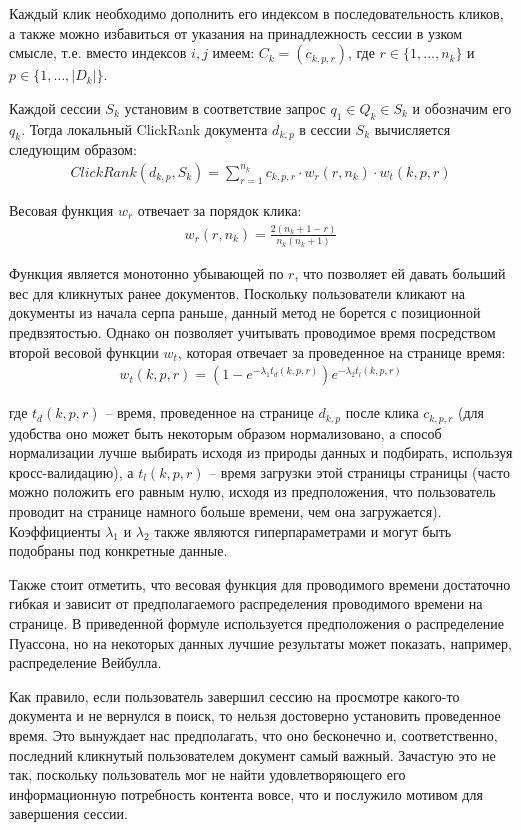\documentclass[diploma]{nanolab2015}
\begin{document}
Каждый клик необходимо дополнить его индексом в последовательность кликов, а также можно избавиться от указания на принадлежность сессии в узком смысле, т.е. вместо индексов $i,j$ имеем: $C_k = (c_{k,p,r})$, где $r \in \{1, \dots, n_k\}$ и $p \in \{1, \dots, |D_k|\}$.

Каждой сессии $S_k$ установим в соответствие запрос $q_1 \in Q_k \in S_k$ и обозначим его $q_k$. Тогда локальный ClickRank \cite{clickrank} документа $d_{k,p}$ в сессии $S_k$ вычисляется следующим образом:
\begin{align}
    ClickRank(d_{k,p}, S_k) = \sum_{r=1}^{n_k} c_{k, p, r} \cdot w_r(r, n_k) \cdot w_t(k,p,r)
\end{align}

Весовая функция $w_r$ отвечает за порядок клика:
\begin{align}
    w_r(r, n_k) = \frac{2(n_k + 1 - r)}{n_k(n_k + 1)}
\end{align}

Функция является монотонно убывающей по $r$, что позволяет ей давать больший вес для кликнутых ранее документов. Поскольку пользователи кликают на документы из начала серпа раньше, данный метод не борется с позиционной предвзятостью. Однако он позволяет учитывать проводимое время посредством второй весовой функции $w_t$, которая отвечает за проведенное на странице время:
\begin{align}
    w_t(k,p,r) = (1 - e^{-\lambda_1 t_d(k,p,r)})e^{-\lambda_2 t_l(k,p,r)}
\end{align}

где $t_d(k,p,r)$ -- время, проведенное на странице $d_{k,p}$ после клика $c_{k,p,r}$ (для удобства оно может быть некоторым образом нормализовано, а способ нормализации лучше выбирать исходя из природы данных и подбирать, используя кросс-валидацию), а $t_l(k,p,r)$ -- время загрузки этой страницы страницы (часто можно положить его равным нулю, исходя из предположения, что пользователь проводит на странице намного больше времени, чем она загружается). Коэффициенты $\lambda_1$ и $\lambda_2$ также являются гиперпараметрами и могут быть подобраны под конкретные данные.

Также стоит отметить, что весовая функция для проводимого времени достаточно гибкая и зависит от предполагаемого распределения проводимого времени на странице. В приведенной формуле используется предположения о распределение Пуассона, но на некоторых данных лучшие результаты может показать, например, распределение Вейбулла.

Как правило, если пользователь завершил сессию на просмотре какого-то документа и не вернулся в поиск, то нельзя достоверно установить проведенное время. Это вынуждает нас предполагать, что оно бесконечно и, соответственно, последний кликнутый пользователем документ самый важный. Зачастую это не так, поскольку пользователь мог не найти удовлетворяющего его информационную потребность контента вовсе, что и послужило мотивом для завершения сессии.
\end{document}
